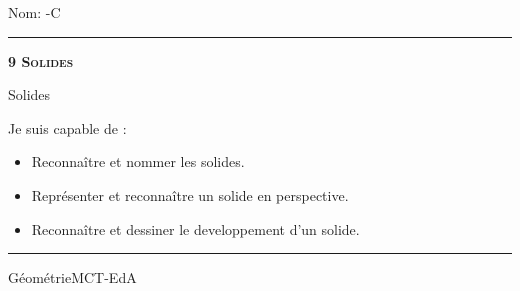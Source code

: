\documentclass[11pt,a4paper]{article}
\begin{document}
\begin{titlepage}
    \setlength{\topskip}{0mm}
Nom: \hfill \the\year-C
\vspace{0.5cm}
\hrule

    \centering
    \vspace{0.1\textheight}
	{\bfseries\scshape\Huge 9 Solides\par}
    \vspace{1.5cm}

    {\huge Solides}
	\vspace{1.5cm}
    
    {\large Je suis capable de :}
    \vspace{1.5cm}
    \begin{itemize}
\item Reconnaître et nommer les solides.
\item Représenter et reconnaître un solide en perspective.
\item Reconnaître et dessiner le developpement d’un solide.\end{itemize}

\vfill
\hrule
\vspace{0.5cm}
Géométrie\hfill MCT-EdA

\end{titlepage}
\end{document}
